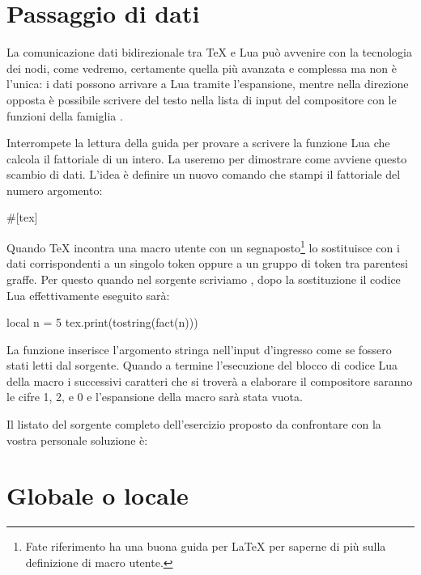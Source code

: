 \section{Passaggio di dati}
\label{secPassaggioDati}

La comunicazione dati bidirezionale tra \TeX{} e Lua può avvenire con la
tecnologia dei nodi, come vedremo, certamente quella più avanzata e complessa
ma non è l'unica: i dati possono arrivare a Lua tramite l'espansione, mentre
nella direzione opposta è possibile scrivere del testo nella lista di input
del compositore con le funzioni della famiglia .

Interrompete la lettura della guida per provare a scrivere la funzione Lua
 che calcola il fattoriale di un intero. La useremo per dimostrare come
avviene questo scambio di dati. L'idea è definire un nuovo comando che stampi il
fattoriale del numero argomento:
\begin{lines}
#[tex]
\newcommand{\fattoriale}[1]{\directlua{
    local n = #1
    tex.print(tostring(fact(n)))
}}
\end{lines}

Quando \TeX{} incontra una macro utente con un segnaposto\footnote{Fate
riferimento ha una buona guida per \LaTeX{} per saperne di più sulla definizione
di macro utente.} lo sostituisce con i dati corrispondenti a un singolo token
oppure a un gruppo di token tra parentesi graffe. Per questo quando nel sorgente
scriviamo , dopo la sostituzione il codice Lua
effettivamente eseguito sarà:
\begin{lines}
local n = 5
tex.print(tostring(fact(n)))
\end{lines}

La funzione  inserisce l'argomento stringa nell'input d'ingresso
come se fossero stati letti dal sorgente. Quando a termine l'esecuzione del
blocco di codice Lua della macro  i successivi caratteri che si
troverà a elaborare il compositore saranno le cifre 1, 2, e 0 e l'espansione
della macro sarà stata vuota.

Il listato del sorgente completo dell'esercizio proposto da confrontare con la
vostra personale soluzione è:


\section{Globale o locale}
\label{secGlobaleLocale}

